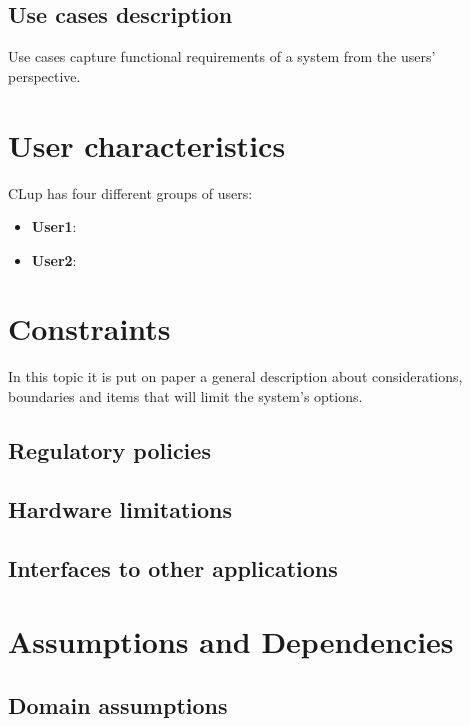 \clearpage
\subsection{Use cases description}
Use cases capture functional requirements of a system from the users' perspective.

\section{User characteristics}
CLup has four different groups of users:
\begin{itemize}
	\item \textbf{User1}:
	
	\item \textbf{User2}: 
		
\end{itemize}

\section{Constraints}
In this topic it is put on paper a general description about considerations, boundaries and items that will limit the system's options.

\subsection{Regulatory policies}
\subsection{Hardware limitations}
\subsection{Interfaces to other applications}

\clearpage

\section{Assumptions and Dependencies}
\subsection{Domain assumptions}
